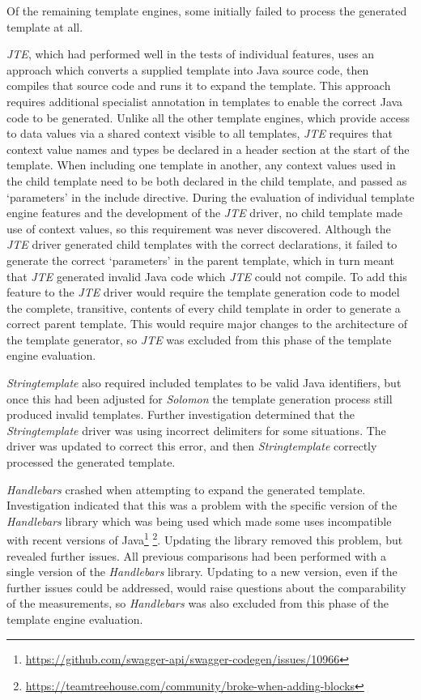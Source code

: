 Of the remaining template engines, some initially  failed to process the generated template at all.

\emph{JTE}, which had performed well in the tests of individual features, uses an approach which converts a supplied template into Java source code, then compiles that source code and runs it to expand the template. This approach requires additional specialist annotation in templates to enable the correct Java code to be generated. Unlike all the other template engines, which provide access to data values via a shared context visible to all templates, \emph{JTE} requires that context value names and types be declared in a header section at the start of the template. When including one template in another, any context values used in the child template need to be both declared in the child template, and passed as `parameters' in the include directive. During the evaluation of individual template engine features and the development of the \emph{JTE} driver, no child template made use of context values, so this requirement was never discovered. Although the \emph{JTE} driver generated child templates with the correct declarations, it failed to generate the correct `parameters' in the parent template, which in turn meant that \emph{JTE} generated invalid Java code which \emph{JTE} could not compile. To add this feature to the \emph{JTE} driver would require the template generation code to model the complete, transitive, contents of every child template in order to generate a correct parent template. This would require major changes to the architecture of the template generator, so \emph{JTE} was excluded from this phase of the template engine evaluation.

\emph{Stringtemplate} also required included templates to be valid Java identifiers, but once this had been adjusted for \emph{Solomon} the template generation process still produced invalid templates. Further investigation determined that the \emph{Stringtemplate} driver was using incorrect delimiters for some situations. The driver was updated to correct this error, and then \emph{Stringtemplate} correctly processed the generated template.

\emph{Handlebars} crashed when attempting to expand the generated template. Investigation indicated that this was a problem with the specific version of the \emph{Handlebars} library which was being used which made some uses incompatible with recent versions of Java\footnote{\url{https://github.com/swagger-api/swagger-codegen/issues/10966}} \footnote{\url{https://teamtreehouse.com/community/broke-when-adding-blocks}}. Updating the library removed this problem, but revealed further issues. All previous comparisons had been performed with a single version of the \emph{Handlebars} library. Updating to a new version, even if the further issues could be addressed, would raise questions about the comparability of the measurements, so \emph{Handlebars} was also excluded from this phase of the template engine evaluation.


